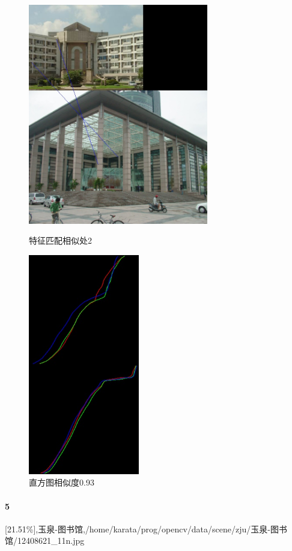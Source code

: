 \begin{figure}[htb]
\begin{minipage}[t]{0.5\linewidth}
\centering
\includegraphics[height=3.8in]{玉泉曹楼.jpg.d/im4sift.jpg}
\caption{特征匹配相似处2}
\label{fig:side:a}
\end{minipage}%
\begin{minipage}[t]{0.5\linewidth}
\centering
\includegraphics[height=3.8in]{玉泉曹楼.jpg.d/im4hist2.jpg}
\caption{直方图相似度0.93}
\label{fig:side:a}
\end{minipage}%
\end{figure}

\paragraph{5}
[21.51\%],玉泉-图书馆,/home/karata/prog/opencv/data/scene/zju/玉泉-图书馆/12408621_11n.jpg

